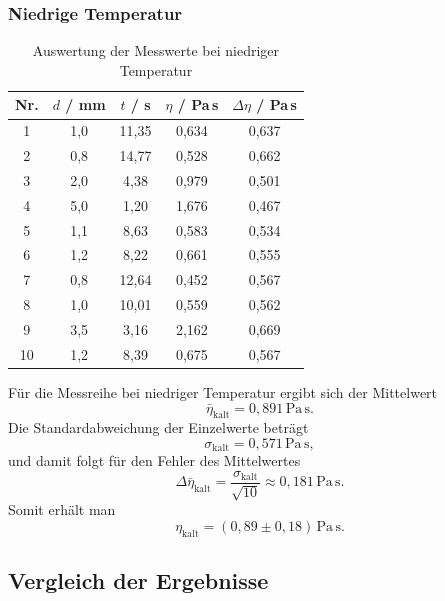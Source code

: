 \documentclass{report}
\begin{document}
\subsubsection{Niedrige Temperatur}

\begin{table}[H]
\centering
\caption{Auswertung der Messwerte bei niedriger Temperatur}
\begin{tabular}{c c c c c}
\toprule
Nr. & $d$ / mm & $t$ / s & $\eta$ / Pa\,s & $\Delta \eta$ / Pa\,s \\
\midrule
1  & 1{,}0 & 11{,}35 & 0{,}634 & 0{,}637 \\
2  & 0{,}8 & 14{,}77 & 0{,}528 & 0{,}662 \\
3  & 2{,}0 & 4{,}38  & 0{,}979 & 0{,}501 \\
4  & 5{,}0 & 1{,}20  & 1{,}676 & 0{,}467 \\
5  & 1{,}1 & 8{,}63  & 0{,}583 & 0{,}534 \\
6  & 1{,}2 & 8{,}22  & 0{,}661 & 0{,}555 \\
7  & 0{,}8 & 12{,}64 & 0{,}452 & 0{,}567 \\
8  & 1{,}0 & 10{,}01 & 0{,}559 & 0{,}562 \\
9  & 3{,}5 & 3{,}16  & 2{,}162 & 0{,}669 \\
10 & 1{,}2 & 8{,}39  & 0{,}675 & 0{,}567 \\
\bottomrule
\end{tabular}
\end{table}

Für die Messreihe bei niedriger Temperatur ergibt sich der Mittelwert
\begin{equation}
    \bar{\eta}_{\mathrm{kalt}} = 0{,}891\,\mathrm{Pa\,s}.
\end{equation}
Die Standardabweichung der Einzelwerte beträgt
\begin{equation}
    \sigma_{\mathrm{kalt}} = 0{,}571\,\mathrm{Pa\,s},
\end{equation}
und damit folgt für den Fehler des Mittelwertes
\begin{equation}
    \Delta \bar{\eta}_{\mathrm{kalt}}
    = \frac{\sigma_{\mathrm{kalt}}}{\sqrt{10}}
    \approx 0{,}181\,\mathrm{Pa\,s}.
\end{equation}
Somit erhält man
\begin{equation}
    \eta_{\mathrm{kalt}} = (0{,}89 \pm 0{,}18)\,\mathrm{Pa\,s}.
\end{equation}

\subsection{Vergleich der Ergebnisse}
\end{document}
